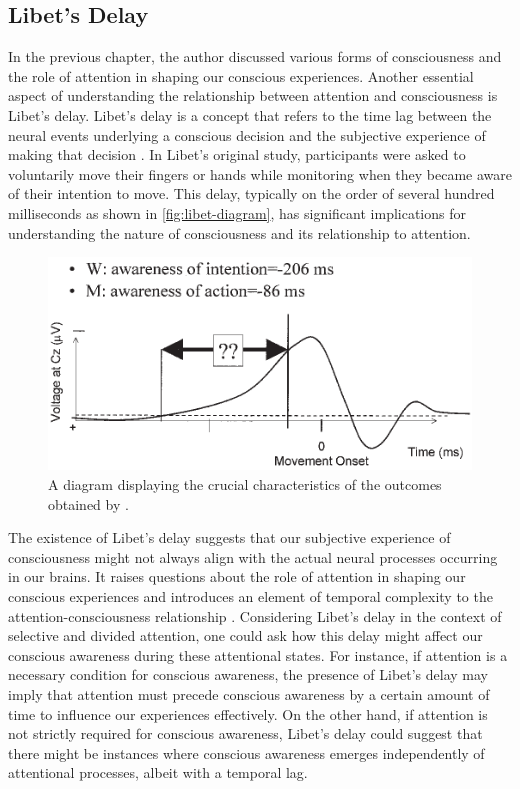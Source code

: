 \documentclass[10pt]{article}
\begin{document}
\begin{sloppypar}
  \subsection{Libet’s Delay}
  \label{sec:libet}

  In the previous chapter, the author discussed various forms of consciousness and the role of attention in shaping our conscious experiences. Another essential aspect of understanding the relationship between attention and consciousness is Libet’s delay. Libet’s delay is a concept that refers to the time lag between the neural events underlying a conscious decision and the subjective experience of making that decision \citep{libet_time_1983}. In Libet’s original study, participants were asked to voluntarily move their fingers or hands while monitoring when they became aware of their intention to move. This delay, typically on the order of several hundred milliseconds as shown in \autoref{fig:libet-diagram}, has significant implications for understanding the nature of consciousness and its relationship to attention.

  \begin{figure}[ht]
    \centering
    \includegraphics[width=\textwidth]{figures/libet.png}
    \caption[A diagram displaying the crucial characteristics of the outcomes obtained by Libet et al.]{A diagram displaying the crucial characteristics of the outcomes obtained by \cite{libet_time_1983} \citep{haggard_conscious_2001}.}
    \label{fig:libet-diagram}
  \end{figure}

  The existence of Libet’s delay suggests that our subjective experience of consciousness might not always align with the actual neural processes occurring in our brains. It raises questions about the role of attention in shaping our conscious experiences and introduces an element of temporal complexity to the attention-consciousness relationship \citep{dijksterhuis_goals_2010}. Considering Libet’s delay in the context of selective and divided attention, one could ask how this delay might affect our conscious awareness during these attentional states. For instance, if attention is a necessary condition for conscious awareness, the presence of Libet’s delay may imply that attention must precede conscious awareness by a certain amount of time to influence our experiences effectively. On the other hand, if attention is not strictly required for conscious awareness, Libet’s delay could suggest that there might be instances where conscious awareness emerges independently of attentional processes, albeit with a temporal lag.


\end{sloppypar}
\end{document}
